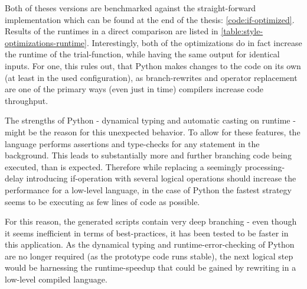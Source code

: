 Both of theses versions are benchmarked against the straight-forward implementation which can be found at the end of the thesis: \ref{code:if-optimized}.
Results of the runtimes in a direct comparison are listed in \autoref{table:style-optimizations-runtime}.
Interestingly, both of the \glqq optimizations\grqq{} do in fact increase the runtime of the trial-function, while having the same output for identical inputs.
For one, this rules out, that Python makes changes to the code on its own (at least in the used configuration), as branch-rewrites and operator replacement are one of the primary ways (even just in time) compilers increase code throughput.

The strengths of Python - dynamical typing and automatic casting on runtime - might be the reason for this unexpected behavior.
To allow for these features, the language performs assertions and type-checks for any statement in the background.
This leads to substantially more and further branching code being executed, than is expected.
Therefore while replacing a seemingly processing-delay introducing if-operation with several logical operations should increase the performance for a low-level language, in the case of Python the fastest strategy seems to be executing as few lines of code as possible.

For this reason, the generated scripts contain very deep branching - even though it seems inefficient in terms of best-practices, it has been tested to be faster in this application.
As the dynamical typing and runtime-error-checking of Python are no longer required (as the prototype code runs stable), the next logical step would be harnessing the runtime-speedup that could be gained by rewriting in a low-level compiled language.
